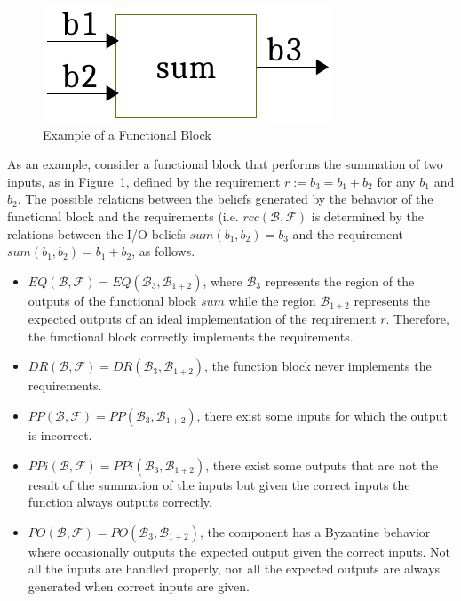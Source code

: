 \documentclass[conference]{IEEEtran}
\newcommand{\beliefRegion}{\mathcal{B}}
\newcommand{\factRegion}{\mathcal{F}}
\newcommand{\Rcc}[2]{rcc(#1,#2)}
\newcommand{\eq}[2]{EQ(#1,#2)}
\newcommand{\pp}[2]{PP(#1,#2)}
\newcommand{\po}[2]{PO(#1,#2)}
\newcommand{\ppi}[2]{PPi(#1,#2)}
\newcommand{\dr}[2]{DR(#1,#2)}
\begin{document}
\begin{figure}[t]
	\centering
	\includegraphics[width=0.3\columnwidth]{sum.pdf}
	\caption{Example of a Functional Block}
	\label{fig:sum}
\end{figure}

As an example, consider a functional block that performs the summation of two
inputs, as in Figure~\ref{fig:sum}, defined by the requirement $r := b_3 = b_1
+ b_2$ for any $b_1$ and $b_2$. The possible relations between the beliefs generated by the behavior of the functional block and
the requirements (i.e. $\Rcc{\beliefRegion}{\factRegion}$ is determined by
the relations between the I/O beliefs $sum(b_1,b_2)=b_3$ and the requirement
$sum(b_1,b_2)=b_1+b_2$, as follows.
\begin{itemize}
	\item $\eq{\beliefRegion}{\factRegion}=\eq{\beliefRegion_3}{\beliefRegion_{1+2}}$, 
		where $\beliefRegion_3$ represents the region of the
		outputs of the functional block $sum$ while the region
		$\beliefRegion_{1+2}$ represents the expected
		outputs of an ideal implementation of the requirement $r$.
		Therefore, the functional block correctly implements the
		requirements.
	\item
		$\dr{\beliefRegion}{\factRegion}=\dr{\beliefRegion_3}{\beliefRegion_{1+2}}$,
		the function block never implements the requirements.
	\item
		$\pp{\beliefRegion}{\factRegion}=\pp{\beliefRegion_3}{\beliefRegion_{1+2}}$, there exist some inputs for which
		the output is incorrect.
	\item $\ppi{\beliefRegion}{\factRegion}=\ppi{\beliefRegion_3}{\beliefRegion_{1+2}}$, there exist some outputs that are not the result of the summation of the inputs but given the correct inputs the function always outputs correctly.
	\item
		$\po{\beliefRegion}{\factRegion}=\po{\beliefRegion_3}{\beliefRegion_{1+2}}$,
		the component has a Byzantine behavior where occasionally
		outputs the expected output given the correct inputs. Not all
		the inputs are handled properly, nor all the expected outputs
		are always generated when correct inputs are given.
\end{itemize}
\end{document}
